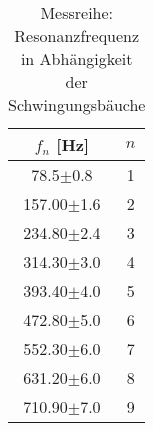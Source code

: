 \begin{table}[H]
    \centering
		\caption{Messreihe: Resonanzfrequenz in Abhängigkeit der Schwingungsbäuche}
	\begin{tabular}{|c|c|}
		\hline
		$ f_{n} $ [Hz] & $ n $ \\
		\hline
		78.5$\pm$0.8& 1 \\
		\hline
		157.00$\pm$1.6& 2 \\
		\hline
		234.80$\pm$2.4& 3 \\
		\hline
		314.30$\pm$3.0& 4 \\
		\hline
		393.40$\pm$4.0& 5 \\
		\hline
		472.80$\pm$5.0& 6 \\
		\hline
		552.30$\pm$6.0& 7 \\
		\hline
		631.20$\pm$6.0& 8 \\
		\hline
		710.90$\pm$7.0& 9 \\
		\hline
	\end{tabular}
	\label{tab: n}	
\end{table}